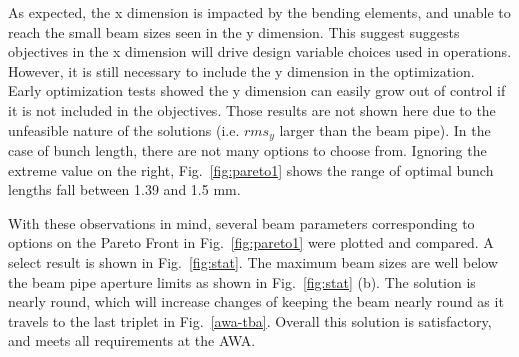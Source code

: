 As expected, the x dimension is impacted by the bending elements, and unable to reach 
the small beam sizes seen in the y dimension. This suggest suggests objectives in the x 
dimension will drive design variable choices used in operations. 
However, it is still necessary to 
include the y dimension in the optimization. Early optimization tests showed the y dimension 
can easily grow out of control if it is not included in the objectives.
Those results are not shown here due to the unfeasible nature of the solutions 
(i.e. $rms_y$ larger than the beam pipe).
In the case of bunch length, there are not many options to choose from.
Ignoring the extreme value on the right, Fig.~\ref{fig:pareto1} shows the 
range of optimal bunch lengths fall between 1.39 and 1.5 mm.

With these observations in mind, several beam parameters corresponding to
options on the Pareto Front in Fig.~\ref{fig:pareto1} were plotted and compared. 
A select result is shown in Fig.~\ref{fig:stat}.  
The maximum beam sizes are well below the beam pipe aperture limits as shown in Fig.~\ref{fig:stat} (b).
The solution is nearly round, which will increase changes of keeping the beam nearly round
as it travels to the last triplet in Fig.~\ref{awa-tba}.
Overall this solution is satisfactory, and meets all requirements at the AWA.

